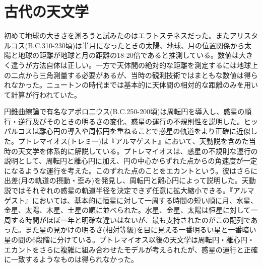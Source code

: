 
\section{古代の天文学}
    初めて地球の大きさを測ろうと試みたのはエラトステネスだった。またアリスタルコス(B.C.310-230頃)は半月になったときの太陽、地球、月の位置関係から太陽と地球の距離が地球と月の距離の18-20倍であると推測している。数値は大きく違うが方法自体は正しい。一方で天体間の絶対的な距離を測定するには地球上の二点から三角測量する必要があるが、当時の観測技術ではまともな数値は得られなかった。ニュートンの時代までは基本的に天体間の相対的な距離のみを用いて計算が行われていた。
	
	円錐曲線論で有名なアポロ二ウス(B.C.250-200頃)は周転円を導入し、惑星の順行・逆行及びそのときの明るさの変化、惑星の運行の不規則性を説明した。ヒッパルコスは離心円の導入や周転円を重ねることで惑星の軌道をより正確に近似した。プトレマイオス(トレミー)は『アルマゲスト』において、天動説を含めた当時の天文学を体系的に解説している。プトレマイオスは、惑星の不規則な運行の説明として、周転円と離心円に加え、円の中心からずれた点からの角速度が一定になるような運行を考えた。このずれた点のことをエカントという。彼はさらに出差(月の軌道の摂動・歪み)を発見し、周転円と離心円によって説明した。天動説ではそれぞれの惑星の軌道半径を決定できず任意に拡大縮小できる。『アルマゲスト』においては、基本的に恒星に対して一周する時間の短い順に月、水星、金星、太陽、木星、土星の順に並べられた。水星、金星、太陽は恒星に対して一周する時間がほぼ一年と明確な違いはないが、最も支持されたのがこの配列であった。また星の見かけの明るさ(相対等級)を目に見える一番明るい星と一番暗い星の間の6段階に分けている。プトレマイオス以後の天文学は周転円・離心円・エカントをさらに複雑に組み合わせたモデルが考えられたが、惑星の運行と正確に一致するようなものは得られなかった。
